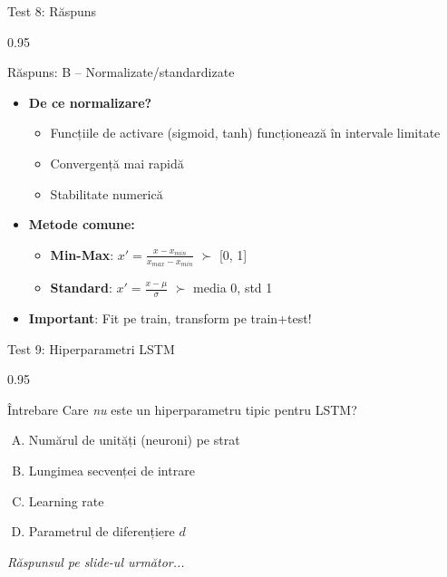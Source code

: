 \documentclass[9pt, aspectratio=169, t]{beamer}
\begin{document}
\begin{frame}{Test 8: Răspuns}
    \begin{cminipage}{0.95\textwidth}
    \begin{exampleblock}{Răspuns: B -- Normalizate/standardizate}
        \begin{itemize}\setlength{\itemsep}{0pt}
            \item \textbf{De ce normalizare?}
            \begin{itemize}\setlength{\itemsep}{0pt}
                \item Funcțiile de activare (sigmoid, tanh) funcționează în intervale limitate
                \item Convergență mai rapidă
                \item Stabilitate numerică
            \end{itemize}
            \item \textbf{Metode comune:}
            \begin{itemize}\setlength{\itemsep}{0pt}
                \item \textbf{Min-Max}: $x' = \frac{x - x_{min}}{x_{max} - x_{min}}$ $\succ$ [0, 1]
                \item \textbf{Standard}: $x' = \frac{x - \mu}{\sigma}$ $\succ$ media 0, std 1
            \end{itemize}
            \item \textbf{Important}: Fit pe train, transform pe train+test!
        \end{itemize}
    \end{exampleblock}
    \end{cminipage}
\end{frame}

\begin{frame}{Test 9: Hiperparametri LSTM}
    \begin{cminipage}{0.95\textwidth}
    \begin{alertblock}{Întrebare}
        Care \emph{nu} este un hiperparametru tipic pentru LSTM?
    \end{alertblock}

    \vspace{0.3cm}

    \begin{enumerate}[A)]\setlength{\itemsep}{0pt}
        \item Numărul de unități (neuroni) pe strat
        \item Lungimea secvenței de intrare
        \item Learning rate
        \item Parametrul de diferențiere $d$
    \end{enumerate}

    \vspace{0.5cm}
    \begin{flushright}\textit{Răspunsul pe slide-ul următor...}\end{flushright}
    \end{cminipage}
\end{frame}
\end{document}
